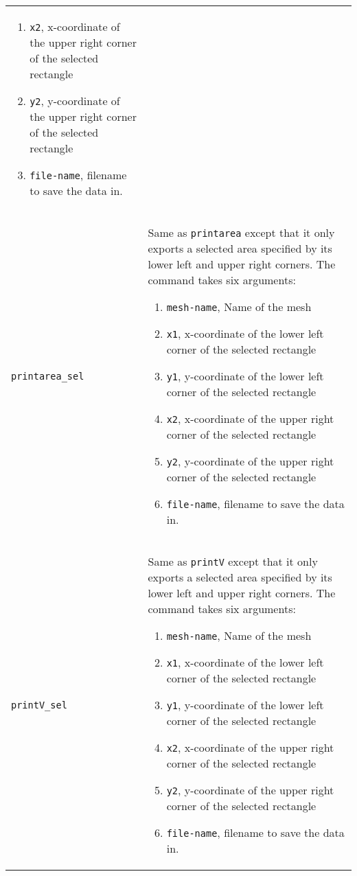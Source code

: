 \documentclass[noshowpacs,preprintnumbers,amsmath,amssymb, letter]{revtex4}
\begin{document}
\begin{longtable}{p{}p{}}
\begin{enumerate}
\item \texttt{x2}, x-coordinate of the upper right corner of the selected rectangle
\item \texttt{y2}, y-coordinate of the upper right corner of the selected rectangle
\item \texttt{file-name}, filename to save the data in.
\end{enumerate}\\
\texttt{printarea\_sel}	& Same as \texttt{printarea} except that it only exports a selected area specified by its lower left and upper right corners. The command takes six arguments:
\begin{enumerate}
\item \texttt{mesh-name}, Name of the mesh
\item \texttt{x1}, x-coordinate of the lower left corner of the selected rectangle
\item \texttt{y1}, y-coordinate of the lower left corner of the selected rectangle
\item \texttt{x2}, x-coordinate of the upper right corner of the selected rectangle
\item \texttt{y2}, y-coordinate of the upper right corner of the selected rectangle
\item \texttt{file-name}, filename to save the data in.
\end{enumerate}\\
\texttt{printV\_sel}		& Same as \texttt{printV} except that it only exports a selected area specified by its lower left and upper right corners. The command takes six arguments:
\begin{enumerate}
\item \texttt{mesh-name}, Name of the mesh
\item \texttt{x1}, x-coordinate of the lower left corner of the selected rectangle
\item \texttt{y1}, y-coordinate of the lower left corner of the selected rectangle
\item \texttt{x2}, x-coordinate of the upper right corner of the selected rectangle
\item \texttt{y2}, y-coordinate of the upper right corner of the selected rectangle
\item \texttt{file-name}, filename to save the data in.
\end{enumerate}\\

\end{longtable}
\end{document}

